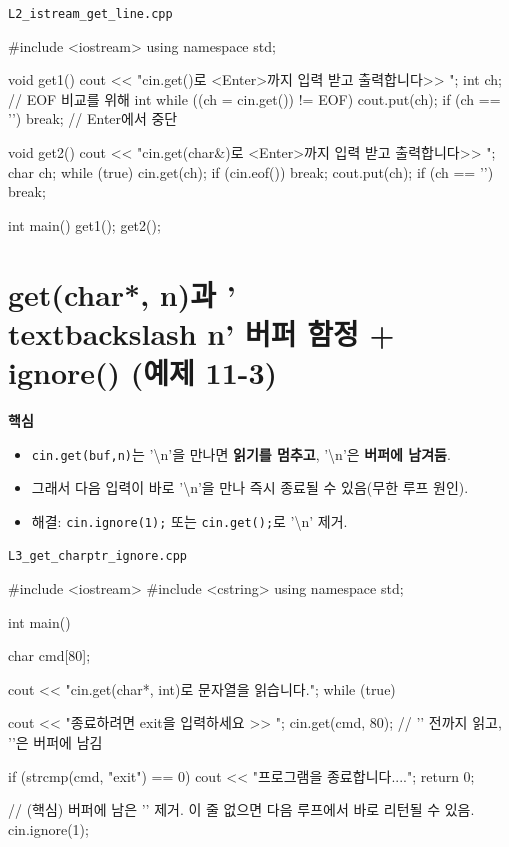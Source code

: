 \documentclass[11pt,a4paper]{article}
\newcommand{\filetag}[1]{\texttt{\color{Accent}#1}}
\begin{document}
\noindent\filetag{L2\_istream\_get\_line.cpp}
\begin{cppcode}
#include <iostream>
using namespace std;

void get1() {
    cout << "cin.get()로 <Enter>까지 입력 받고 출력합니다>> ";
    int ch; // EOF 비교를 위해 int
    while ((ch = cin.get()) != EOF) {
        cout.put(ch);
        if (ch == '\n') break; // Enter에서 중단
    }
}

void get2() {
    cout << "cin.get(char&)로 <Enter>까지 입력 받고 출력합니다>> ";
    char ch;
    while (true) {
        cin.get(ch);
        if (cin.eof()) break;
        cout.put(ch);
        if (ch == '\n') break;
    }
}

int main() {
    get1();
    get2();
}
\end{cppcode}

\section{get(char*, n)과 '\\textbackslash n' 버퍼 함정 + ignore() (예제 11-3)}
\begin{GoalBox}
\textbf{핵심}
\begin{itemize}[leftmargin=18pt]
  \item \texttt{cin.get(buf,n)}는 '\textbackslash n'을 만나면 \textbf{읽기를 멈추고}, '\textbackslash n'은 \textbf{버퍼에 남겨둠}. %
  \item 그래서 다음 입력이 바로 '\textbackslash n'을 만나 즉시 종료될 수 있음(무한 루프 원인).
  \item 해결: \texttt{cin.ignore(1);} 또는 \texttt{cin.get();}로 '\textbackslash n' 제거.
\end{itemize}
\end{GoalBox}

\noindent\filetag{L3\_get\_charptr\_ignore.cpp}
\begin{cppcode}
#include <iostream>
#include <cstring>
using namespace std;

int main() {
    char cmd[80];

    cout << "cin.get(char*, int)로 문자열을 읽습니다.\n";
    while (true) {
        cout << "종료하려면 exit을 입력하세요 >> ";
        cin.get(cmd, 80); // '\n' 전까지 읽고, '\n'은 버퍼에 남김

        if (strcmp(cmd, "exit") == 0) {
            cout << "프로그램을 종료합니다....\n";
            return 0;
        }

        // (핵심) 버퍼에 남은 '\n' 제거. 이 줄 없으면 다음 루프에서 바로 리턴될 수 있음.
        cin.ignore(1);
    }
}
\end{cppcode}
\end{document}
